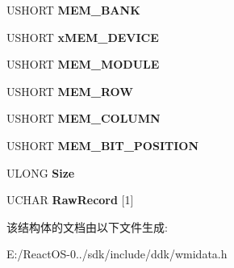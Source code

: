 \begin{DoxyCompactItemize}
\item 
\mbox{\label{struct___m_s_m_c_a_event___memory_error_aac085e14d7a4037f6fa9cbf8e5422ec7}} 
U\+S\+H\+O\+RT {\bfseries M\+E\+M\+\_\+\+B\+A\+NK}
\item 
\mbox{\label{struct___m_s_m_c_a_event___memory_error_a456631e35d49c42cbd717c6f9527ec63}} 
U\+S\+H\+O\+RT {\bfseries x\+M\+E\+M\+\_\+\+D\+E\+V\+I\+CE}
\item 
\mbox{\label{struct___m_s_m_c_a_event___memory_error_ae0cd4a52f763865fa3928c19882a1aef}} 
U\+S\+H\+O\+RT {\bfseries M\+E\+M\+\_\+\+M\+O\+D\+U\+LE}
\item 
\mbox{\label{struct___m_s_m_c_a_event___memory_error_a6879b9b008fceac2ad5ee7f7a7539c32}} 
U\+S\+H\+O\+RT {\bfseries M\+E\+M\+\_\+\+R\+OW}
\item 
\mbox{\label{struct___m_s_m_c_a_event___memory_error_a8c7e5e1fdf7c9d4b1742bfa41a37e5c9}} 
U\+S\+H\+O\+RT {\bfseries M\+E\+M\+\_\+\+C\+O\+L\+U\+MN}
\item 
\mbox{\label{struct___m_s_m_c_a_event___memory_error_a277c4b59a71508eaa6d3e033dd6f5f14}} 
U\+S\+H\+O\+RT {\bfseries M\+E\+M\+\_\+\+B\+I\+T\+\_\+\+P\+O\+S\+I\+T\+I\+ON}
\item 
\mbox{\label{struct___m_s_m_c_a_event___memory_error_a10dd1f9c86c9c33962af298d63e0b46e}} 
U\+L\+O\+NG {\bfseries Size}
\item 
\mbox{\label{struct___m_s_m_c_a_event___memory_error_a47529475944831fd700cfccadcf6e3b7}} 
U\+C\+H\+AR {\bfseries Raw\+Record} \mbox{[}1\mbox{]}
\end{DoxyCompactItemize}


该结构体的文档由以下文件生成\+:\begin{DoxyCompactItemize}
\item 
E\+:/\+React\+O\+S-\/0../sdk/include/ddk/wmidata.\+h\end{DoxyCompactItemize}
